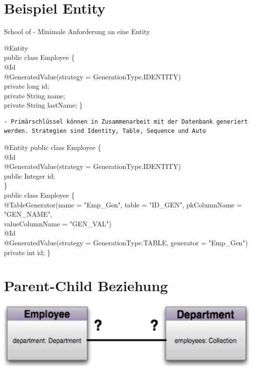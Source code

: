 \section*{Beispiel Entity}

School of
- Minimale Anforderung an eine Entity


@Entity\\
public class Employee \{\\
@Id\\
@GeneratedValue(strategy = GenerationType.IDENTITY)\\
private long id;\\
private String name;\\
private String lastName;
\}

\begin{verbatim}
- Primärschlüssel können in Zusammenarbeit mit der Datenbank generiert werden. Strategien sind Identity, Table, Sequence und Auto
\end{verbatim}

@Entity public class Employee \{\\
@Id\\
@GeneratedValue(strategy = GenerationType.IDENTITY)\\
public Integer id;\\
\}\\
public class Employee \{\\
@TableGenerator(name = "Emp\_Gen", table = "ID\_GEN", pkColumnName = "GEN\_NAME",\\
valueColumnName = "GEN\_VAL")\\
@Id\\
@GeneratedValue(strategy = GenerationType.TABLE, generator = "Emp\_Gen")\\
private int id;
\}



\section*{Parent-Child Beziehung}

\includegraphics[width=\linewidth]{images/2025_01_02_5ba1dc702e9f94ba8e06g-33.jpg}

